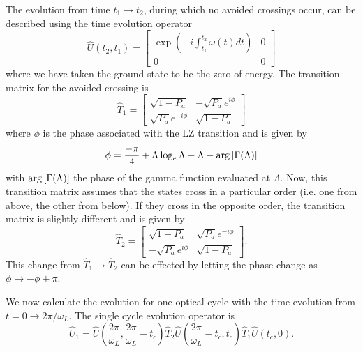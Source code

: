 The evolution from time $t_1 \rightarrow t_2$, during which no avoided crossings
occur, can be described using the time evolution operator
\begin{equation}
\hat{U}(t_2,t_1) = \left[\begin{array}{cc}
               \exp(-i\int_{t_1}^{t_2}\omega(t)dt) & 0 \\
	      0 & 0
	     \end{array}\right]
\end{equation}
where we have taken the ground state to be the zero of energy.
The transition matrix for the avoided crossing is \cite{Gatzke:95}
\begin{equation}
\hat{T}_1 = \left[\begin{array}{cc}
               \sqrt{1 - P_a} & -\sqrt{P_a} e^{i\phi} \\
	       \sqrt{P_a} e^{-i\phi} & \sqrt{1 - P_a}
	    \end{array} \right]
\end{equation}
where $\phi$ is the phase associated with the LZ transition and is given by
\cite{Garraway:92}
\begin{equation}
\phi = \frac{-\pi}{4} + \Lambda \log_e \Lambda -\Lambda -
{\rm arg}\left[\Gamma(\Lambda)\right]
\label{phi}
\end{equation}
with ${\rm arg}\left[\Gamma(\Lambda)\right]$ the phase of the gamma function
evaluated at $\Lambda$.
Now, this transition matrix assumes that the states cross in a
particular order (i.e. one from above, the other from below).  If they cross
in the opposite order, the transition matrix is slightly different and is given
by
\begin{equation}
\hat{T}_2 = \left[\begin{array}{cc}
               \sqrt{1 - P_a} & \sqrt{P_a} e^{-i\phi} \\
	       -\sqrt{P_a} e^{i\phi} & \sqrt{1 - P_a}
	    \end{array} \right].
\end{equation}
This change from $\hat{T}_1 \rightarrow \hat{T}_2$ can be effected by letting
the phase change as $\phi \rightarrow -\phi \pm \pi$.

We now calculate the evolution for one optical cycle with the
time evolution from $t=0 \rightarrow 2\pi/\omega_L$.  The single cycle
evolution operator is
\begin{equation}
\hat{U}_1 =
\hat{U}\left(\frac{2\pi}{\omega_L},\frac{2\pi}{\omega_L}-t_c\right)\hat{T}_2
\hat{U}\left(\frac{2\pi}{\omega_L} -t_c,t_c\right)\hat{T}_1\hat{U}(t_c,0).
\end{equation}


